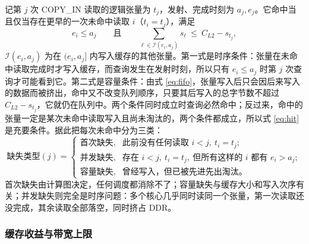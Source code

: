 记第 $j$ 次 COPY\_IN 读取的逻辑张量为 $t_j$，发射、完成时刻为 $a_j,e_j$。它命中当且仅当存在更早的一次未命中读取 $i$（$t_i=t_j$），满足
\begin{equation}
  e_i\le a_j\qquad\text{且}\qquad \sum_{\ell\in\mathcal{I}(e_i,a_j)} s_\ell\ \le\ C_{L2}-s_{t_j},
  \label{eq:hit}
\end{equation}
$\mathcal{I}(e_i,a_j)$ 为在 $(e_i,a_j]$ 内写入缓存的其他张量。第一式是时序条件：张量在未命中读取完成时才写入缓存，而查询发生在发射时刻，所以只有 $e_i\le a_j$ 时第 $j$ 次查询才可能看到它。第二式是容量条件：由式 \eqref{eq:fifo}，张量写入后只会因后来写入的数据而被挤出，命中又不改变队列顺序，只要其后写入的总字节数不超过 $C_{L2}-s_{t_j}$，它就仍在队列中。两个条件同时成立时查询必然命中；反过来，命中的张量一定是某次未命中读取写入且尚未淘汰的，两个条件都成立，所以式 \eqref{eq:hit} 是充要条件。据此把每次未命中分为三类\cite{hill1989evaluating}：
\begin{equation}
  \text{缺失类型}(j)=
  \begin{cases}
  \text{首次缺失}, & \text{此前没有任何读取 } i<j,\ t_i=t_j;\\
  \text{并发缺失}, & \text{存在 } i<j,\ t_i=t_j,\ \text{但所有这样的 } i \text{ 都有 } e_i>a_j;\\
  \text{容量缺失}, & \text{曾经写入，但已被先进先出淘汰。}
  \end{cases}
  \label{eq:miss-class}
\end{equation}
首次缺失由计算图决定，任何调度都消除不了；容量缺失与缓存大小和写入次序有关；并发缺失则完全是时序问题：多个核心几乎同时读同一个张量，第一次读取还没完成，其余读取全部落空，同时挤占 DDR。

\subsubsection{缓存收益与带宽上限}\label{sec:p3-benefit}

